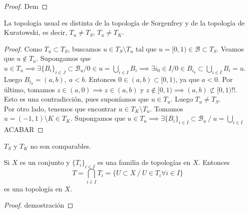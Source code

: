 \begin{proof}
    Dem
\end{proof}
\begin{properties}
  La topología usual es distinta de la topología de Sorgenfrey y de la topología de Kuratowski, es decir, $T_u \neq T_S$, $T_u \neq T_K$.
\end{properties}
\begin{proof}
  Como $T_u \subset T_S$, buscamos $u \in T_S \setminus T_u$ tal que $u = [0,1) \in \mathcal{B} \subset T_S$. Veamos que $u \not\in T_u$. Supongamos que $u \in T_u \implies \exists \{B_i\}_{i \in J} \subset \mathcal{B}_u / 0 \in u = \bigcup_{i \in I}B_i \implies \exists i_0 \in I / 0 \in B_{i_0} \subset  \bigcup_{i \in I} B_i = u$. Luego $B_{i_0} = (a,b),\ a<b$. Entonces $0 \in (a,b) \subset [0,1)$, ya que $a<0$. Por último, tomamos $z \in (a,0) \implies z \in (a,b)$ y $z \not\in [0,1) \implies (a,b) \not\subset [0,1)!!$. Esto es una contradicción, pues suponíamos que $u \in T_u$. Luego $T_u \neq T_S$. \\
  Por otro lado, tenemos que encontrar $u \in T_K \setminus T_u$. Tomamos $u = (-1,1) \setminus K \in T_K$. Supongamos que $u \in T_u \implies \exists \{B_i\}_{i \in I} \subset \mathcal{B}_u\ /\ u = \bigcup_{i \in I}$ ACABAR
\end{proof}
\begin{properties}
    $T_S$ y $T_K$ no son comparables.
\end{properties}

\begin{lema}
  Si $X$ es un conjunto y $\{T_i\}_{i \in I}$ es una familia de topologías en $X$. Entonces \[T=\bigcap_{i \in I} T_i = \{U \subset X\ /\ U \in T_i \forall i \in I\} \] es una topología en $X$.
\end{lema}
\begin{proof}
  demostración
\end{proof}

